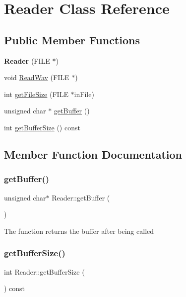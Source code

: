 \hypertarget{classReader}{}\section{Reader Class Reference}
\label{classReader}
\subsection*{Public Member Functions}
\begin{DoxyCompactItemize}
\item 
\mbox{\label{classReader_a7cd76dec58af34626d0d7f928d077773}} 
{\bfseries Reader} (F\+I\+LE $\ast$)
\item 
void \hyperlink{classReader_aa33ad038bf60829bd30149a5b8436bb2}{Read\+Wav} (F\+I\+LE $\ast$)
\item 
int \hyperlink{classReader_a26e7eb6fabd4424304d00658907a4878}{get\+File\+Size} (F\+I\+LE $\ast$in\+File)
\item 
unsigned char $\ast$ \hyperlink{classReader_a5cc512699b1ae2e13186977ccdffe8f7}{get\+Buffer} ()
\item 
int \hyperlink{classReader_af56ef824ae4f49fb6cfc89d7443e9ede}{get\+Buffer\+Size} () const
\end{DoxyCompactItemize}


\subsection{Member Function Documentation}
\mbox{\label{classReader_a5cc512699b1ae2e13186977ccdffe8f7}} 
\subsubsection{\texorpdfstring{get\+Buffer()}{getBuffer()}}
{\footnotesize\ttfamily unsigned char$\ast$ Reader\+::get\+Buffer (\begin{DoxyParamCaption}{ }\end{DoxyParamCaption})}

The function returns the buffer after being called \mbox{\label{classReader_af56ef824ae4f49fb6cfc89d7443e9ede}} 
\subsubsection{\texorpdfstring{get\+Buffer\+Size()}{getBufferSize()}}
{\footnotesize\ttfamily int Reader\+::get\+Buffer\+Size (\begin{DoxyParamCaption}{ }\end{DoxyParamCaption}) const}

